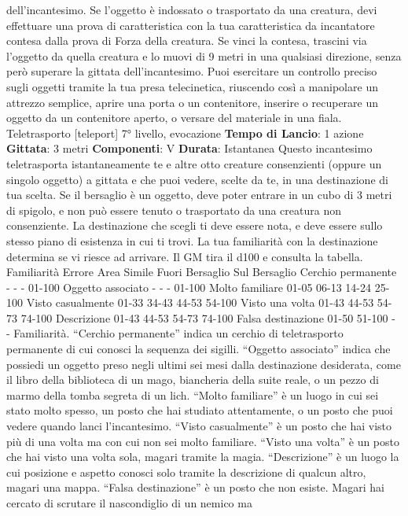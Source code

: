 \begin{multicols}{2}
dell’incantesimo.
Se l’oggetto è indossato o trasportato da una creatura,
devi effettuare una prova di caratteristica con la tua
caratteristica da incantatore contesa dalla prova di
Forza della creatura. Se vinci la contesa, trascini via
l’oggetto da quella creatura e lo muovi di 9 metri in una
qualsiasi direzione, senza però superare la gittata
dell’incantesimo.
Puoi esercitare un controllo preciso sugli oggetti tramite
la tua presa telecinetica, riuscendo così a manipolare
un attrezzo semplice, aprire una porta o un contenitore,
inserire o recuperare un oggetto da un contenitore
aperto, o versare del materiale in una fiala.
Teletrasporto
[teleport]
7° livello, evocazione
\textbf{Tempo di Lancio}: 1 azione
\textbf{Gittata}: 3 metri
\textbf{Componenti}: V
\textbf{Durata}: Istantanea
Questo incantesimo teletrasporta istantaneamente te e
altre otto creature consenzienti (oppure un singolo
oggetto) a gittata e che puoi vedere, scelte da te, in una
destinazione di tua scelta. Se il bersaglio è un oggetto,
deve poter entrare in un cubo di 3 metri di spigolo, e
non può essere tenuto o trasportato da una creatura
non consenziente.
La destinazione che scegli ti deve essere nota, e deve
essere sullo stesso piano di esistenza in cui ti trovi. La
tua familiarità con la destinazione determina se vi riesce
ad arrivare. Il GM tira il d100 e consulta la tabella.
Familiarità Errore Area
Simile
Fuori
Bersaglio
Sul
Bersaglio
Cerchio
permanente
- - - 01-100
Oggetto
associato
- - - 01-100
Molto
familiare
01-05 06-13 14-24 25-100
Visto
casualmente
01-33 34-43 44-53 54-100
Visto una
volta
01-43 44-53 54-73 74-100
Descrizione 01-43 44-53 54-73 74-100
Falsa
destinazione
01-50 51-100 - -
Familiarità. “Cerchio permanente” indica un cerchio di
teletrasporto permanente di cui conosci la sequenza dei
sigilli. “Oggetto associato” indica che possiedi un
oggetto preso negli ultimi sei mesi dalla destinazione
desiderata, come il libro della biblioteca di un mago,
biancheria della suite reale, o un pezzo di marmo della
tomba segreta di un lich.
“Molto familiare” è un luogo in cui sei stato molto
spesso, un posto che hai studiato attentamente, o un
posto che puoi vedere quando lanci l’incantesimo.
“Visto casualmente” è un posto che hai visto più di una
volta ma con cui non sei molto familiare. “Visto una
volta” è un posto che hai visto una volta sola, magari
tramite la magia. “Descrizione” è un luogo la cui
posizione e aspetto conosci solo tramite la descrizione
di qualcun altro, magari una mappa.
“Falsa destinazione” è un posto che non esiste. Magari
hai cercato di scrutare il nascondiglio di un nemico ma

\end{multicols}
